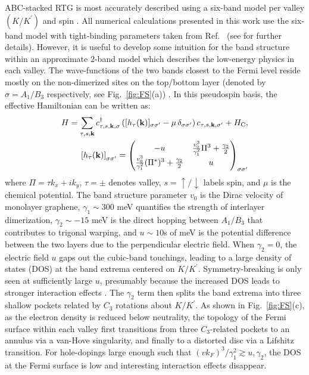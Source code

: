 \documentclass[aps,pra,twocolumn,superscriptaddress,10pt,article,nofootinbib,showpacs,longbibliography]{revtex4-1}
\def \k{{\mathbf k}}
\def \beq{\begin{eqnarray}}
\def \eeq{\end{eqnarray}}
\def \nn{\nonumber \\}
\begin{document}
ABC-stacked RTG is most accurately described using a six-band model per valley $(K/K^\prime)$ and spin \cite{Zhang2010,Jung2013}. 
All numerical calculations presented in this work use the six-band model with tight-binding parameters taken from Ref.~ (see  for further details). 
However, it is useful to develop some intuition for the band structure within an approximate 2-band model which describes the low-energy physics in each valley.
The wave-functions of the two bands closest to the Fermi level reside mostly on the non-dimerized sites on the top/bottom layer (denoted by $\sigma = A_1/B_3$ respectively, see Fig.~\ref{fig:FS}(a)) \cite{SM}.
In this pseudospin basis, the effective Hamiltonian can be written as:
\beq
H = \sum_{\tau,s,\k} c^\dagger_{\tau,s,\k, \sigma} \left(  [h_{\tau}(\k)]_{\sigma \sigma^\prime} - \mu \, \delta_{\sigma \sigma^\prime} \right) c_{\tau,s, \k, \sigma^\prime} + H_{\rm C}, \nn 
\left[h_{\tau}(\k)\right]_{\sigma \sigma^\prime} = \begin{pmatrix} - u & \frac{v_0^3}{\gamma_1^2}\Pi^3 + \frac{\gamma_2}{2} \\ \frac{v_0^3}{\gamma_1^2}(\Pi^*)^3 + \frac{\gamma_2}{2} & u 
\end{pmatrix}_{\sigma \sigma^\prime}
\label{eq:Hfree}
\eeq
where $\Pi = \tau k_x + i k_y$, $\tau = \pm$ denotes valley, $s = \uparrow / \downarrow$ labels spin, and $\mu$ is the chemical potential. 
The band structure parameter 
$v_0$ is the Dirac velocity of monolayer graphene, $\gamma_1 \sim 300$ meV quantifies the strength of interlayer dimerization, $\gamma_2 \sim -15$ meV is the direct hopping between $A_1/B_3$ that contributes to trigonal warping, and $u \sim 10$s of meV is the potential difference between the two layers due to the perpendicular electric field.
When $\gamma_2 = 0$, the electric field $u$ gaps out the cubic-band touchings, leading to a  large density of states (DOS) at the band extrema centered on $K/K^\prime$. 
Symmetry-breaking is only seen at sufficiently large $u$, presumably because the increased DOS leads to stronger interaction effects \cite{Zhou2021_ABCmetals}.
The  $\gamma_2$ term then splits the band extrema into three shallow pockets related by $C_3$ rotations about $K/K^\prime$.
As shown in Fig.~\ref{fig:FS}(c), as the electron density is reduced below  neutrality, the topology of the Fermi surface within each valley first transitions from three $C_3$-related pockets to an annulus via a van-Hove singularity, and finally to a distorted disc via a Lifshitz transition.
For hole-dopings large enough such that $(vk_F)^3/\gamma_1^2 \gtrsim u,\gamma_2$, the DOS at the Fermi surface is low and interesting interaction effects disappear.
\end{document}
